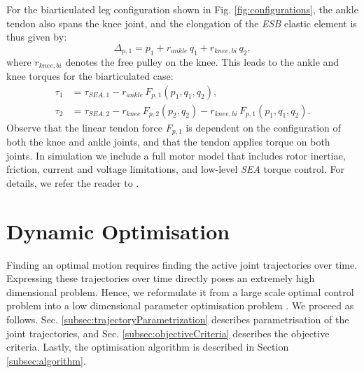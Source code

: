 \documentclass[letterpaper, 10 pt, conference]{ieeeconf}  %
\begin{document}
For the biarticulated leg configuration shown in Fig. \ref{fig:configurations}, the ankle tendon also spans the knee joint, and the elongation of the \textit{ESB} elastic element is thus given by:
\begin{equation}
	\Delta_{p,1} = p_1 + r_{ankle} \, q_1 + r_{knee,bi} \, q_2,
	\label{eq:Delta_p_biart}
\end{equation}
where $r_{knee,bi}$ denotes the free pulley on the knee. This leads to the ankle and knee torques for the biarticulated case:
\begin{equation}
	\begin{aligned}
		\tau_1 &= \tau_{SEA,1} - r_{ankle} \, F_{p,1}(p_1,q_1,q_2), \\
		\tau_2 &= \tau_{SEA,2} - r_{knee} \, F_{p,2}(p_2,q_2) - r_{knee,bi} \, F_{p,1}(p_1,q_1,q_2).
	\end{aligned}
\end{equation}
Observe that the linear tendon force $F_{p,1}$ is dependent on the configuration of both the knee and ankle joints, and that the tendon applies torque on both joints. In simulation we include a full motor model that includes rotor inertiae, friction, current and voltage limitations, and low-level \textit{SEA} torque control. For details, we refer the reader to \cite{roozing2016design}.


\section{Dynamic Optimisation} 
\label{sec:dynamicOptimisation}
Finding an optimal motion requires finding the active joint trajectories over time. Expressing these trajectories over time directly poses an extremely high dimensional problem. Hence, we reformulate it from a large scale optimal control problem into a low dimensional parameter optimisation problem \cite{kaphle2008optimality}. We proceed as follows. Sec. \ref{subsec:trajectoryParametrization} describes parametrisation of the joint trajectories, and Sec. \ref{subsec:objectiveCriteria} describes the objective criteria. Lastly, the optimisation algorithm is described in Section \ref{subsec:algorithm}.
\end{document}
